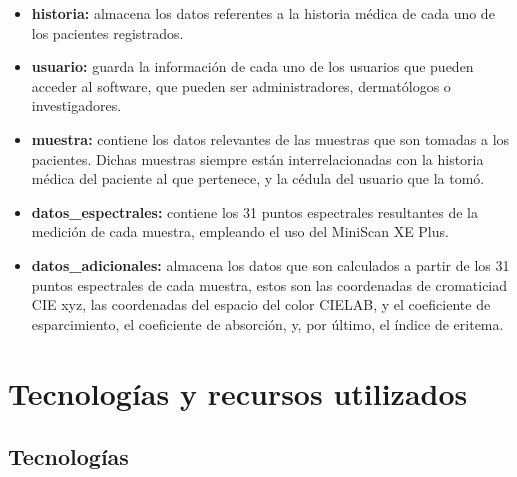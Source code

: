 		\begin{itemize}
				
				\item \textbf{historia:} almacena los datos referentes a la historia m\'{e}dica de cada uno de los pacientes registrados.
				
				\item \textbf{usuario:} guarda la informaci\'{o}n de cada uno de los usuarios que pueden acceder al software, que pueden ser administradores, dermat\'{o}logos o investigadores.
				
				\item \textbf{muestra:} contiene los datos relevantes de las muestras que son tomadas a los pacientes. Dichas muestras siempre est\'{a}n interrelacionadas con la historia m\'{e}dica del paciente al que pertenece, y la c\'{e}dula del usuario que la tom\'{o}.

				\item \textbf{datos\_espectrales:} contiene los 31 puntos espectrales resultantes de la medici\'{o}n de cada muestra, empleando el uso del MiniScan XE Plus.
				
				\item \textbf{datos\_adicionales:} almacena los datos que son calculados a partir de los 31 puntos espectrales de cada muestra, estos son las coordenadas de cromaticiad CIE xyz, las coordenadas del espacio del color CIELAB, y el coeficiente de esparcimiento, el coeficiente de absorci\'{o}n, y, por \'{u}ltimo, el \'{i}ndice de eritema.
				
		\end{itemize}
		
\section{Tecnolog\'{i}as y recursos utilizados}

	\subsection{Tecnolog\'{i}as}
	
